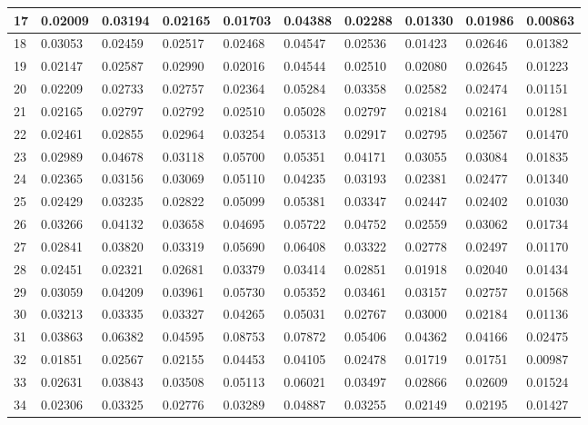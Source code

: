 \begin{table}[H]
{\begin{tabular}{|l|l|l|l|l|l|l|l|l|l|}
        17 & 0.02009 & 0.03194 & 0.02165 & 0.01703 & 0.04388 & 0.02288 & 0.01330 & 0.01986 & 0.00863 \\ \hline
        18 & 0.03053 & 0.02459 & 0.02517 & 0.02468 & 0.04547 & 0.02536 & 0.01423 & 0.02646 & 0.01382 \\ \hline
        19 & 0.02147 & 0.02587 & 0.02990 & 0.02016 & 0.04544 & 0.02510 & 0.02080 & 0.02645 & 0.01223 \\ \hline
        20 & 0.02209 & 0.02733 & 0.02757 & 0.02364 & 0.05284 & 0.03358 & 0.02582 & 0.02474 & 0.01151 \\ \hline
        21 & 0.02165 & 0.02797 & 0.02792 & 0.02510 & 0.05028 & 0.02797 & 0.02184 & 0.02161 & 0.01281 \\ \hline
        22 & 0.02461 & 0.02855 & 0.02964 & 0.03254 & 0.05313 & 0.02917 & 0.02795 & 0.02567 & 0.01470 \\ \hline
        23 & 0.02989 & 0.04678 & 0.03118 & 0.05700 & 0.05351 & 0.04171 & 0.03055 & 0.03084 & 0.01835 \\ \hline
        24 & 0.02365 & 0.03156 & 0.03069 & 0.05110 & 0.04235 & 0.03193 & 0.02381 & 0.02477 & 0.01340 \\ \hline
        25 & 0.02429 & 0.03235 & 0.02822 & 0.05099 & 0.05381 & 0.03347 & 0.02447 & 0.02402 & 0.01030 \\ \hline
        26 & 0.03266 & 0.04132 & 0.03658 & 0.04695 & 0.05722 & 0.04752 & 0.02559 & 0.03062 & 0.01734 \\ \hline
        27 & 0.02841 & 0.03820 & 0.03319 & 0.05690 & 0.06408 & 0.03322 & 0.02778 & 0.02497 & 0.01170 \\ \hline
        28 & 0.02451 & 0.02321 & 0.02681 & 0.03379 & 0.03414 & 0.02851 & 0.01918 & 0.02040 & 0.01434 \\ \hline
        29 & 0.03059 & 0.04209 & 0.03961 & 0.05730 & 0.05352 & 0.03461 & 0.03157 & 0.02757 & 0.01568 \\ \hline
        30 & 0.03213 & 0.03335 & 0.03327 & 0.04265 & 0.05031 & 0.02767 & 0.03000 & 0.02184 & 0.01136 \\ \hline
        31 & 0.03863 & 0.06382 & 0.04595 & 0.08753 & 0.07872 & 0.05406 & 0.04362 & 0.04166 & 0.02475 \\ \hline
        32 & 0.01851 & 0.02567 & 0.02155 & 0.04453 & 0.04105 & 0.02478 & 0.01719 & 0.01751 & 0.00987 \\ \hline
        33 & 0.02631 & 0.03843 & 0.03508 & 0.05113 & 0.06021 & 0.03497 & 0.02866 & 0.02609 & 0.01524 \\ \hline
        34 & 0.02306 & 0.03325 & 0.02776 & 0.03289 & 0.04887 & 0.03255 & 0.02149 & 0.02195 & 0.01427 \\ \hline

\end{tabular}}
\end{table}
